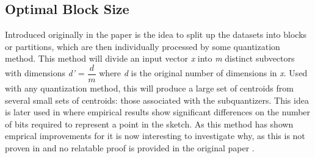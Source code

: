 \subsection{Optimal Block Size}
Introduced originally in the paper \cite{schmid9} is the idea to split up the datasets into blocks or partitions, which are then individually processed by some quantization method. This method will divide an input vector \textit{x} into \textit{m} distinct subvectors with dimensions \textit{d'} = $\dfrac{d}{m}$ where \textit{d} is the original number of dimensions in \textit{x}. Used with any quantization method, this will produce a large set of centroids from several small sets of centroids: those associated with the subquantizers. This idea is later used in \cite{wagner17} where empirical results show significant differences on the number of bits required to represent a point in the sketch. As this method has shown emprical improvements for \qs{} it is now interesting to investigate why, as this is not proven in \cite{wagner17} and no relatable proof is provided in the original paper \cite{schmid9}. 